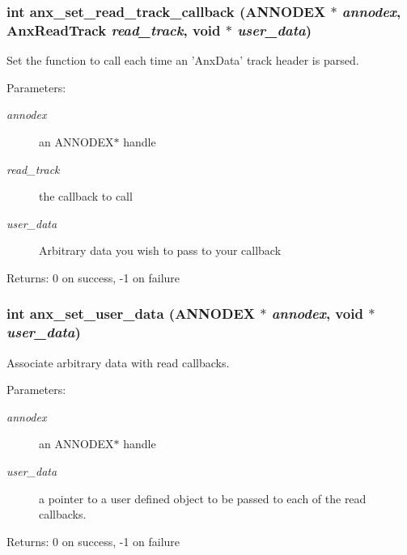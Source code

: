 \subsubsection{\setlength{\rightskip}{0pt plus 5cm}int anx\_\-set\_\-read\_\-track\_\-callback ({\bf ANNODEX} $\ast$ {\em annodex}, {\bf Anx\-Read\-Track} {\em read\_\-track}, void $\ast$ {\em user\_\-data})}\label{anx__read_8h_a7}


Set the function to call each time an 'Anx\-Data' track header is parsed. 

\begin{Desc}
\item[Parameters:]
\begin{description}
\item[{\em annodex}]an ANNODEX$\ast$ handle \item[{\em read\_\-track}]the callback to call \item[{\em user\_\-data}]Arbitrary data you wish to pass to your callback \end{description}
\end{Desc}
\begin{Desc}
\item[Returns:]0 on success, -1 on failure \end{Desc}
\subsubsection{\setlength{\rightskip}{0pt plus 5cm}int anx\_\-set\_\-user\_\-data ({\bf ANNODEX} $\ast$ {\em annodex}, void $\ast$ {\em user\_\-data})}\label{anx__read_8h_a15}


Associate arbitrary data with read callbacks. 

\begin{Desc}
\item[Parameters:]
\begin{description}
\item[{\em annodex}]an ANNODEX$\ast$ handle \item[{\em user\_\-data}]a pointer to a user defined object to be passed to each of the read callbacks. \end{description}
\end{Desc}
\begin{Desc}
\item[Returns:]0 on success, -1 on failure \end{Desc}
